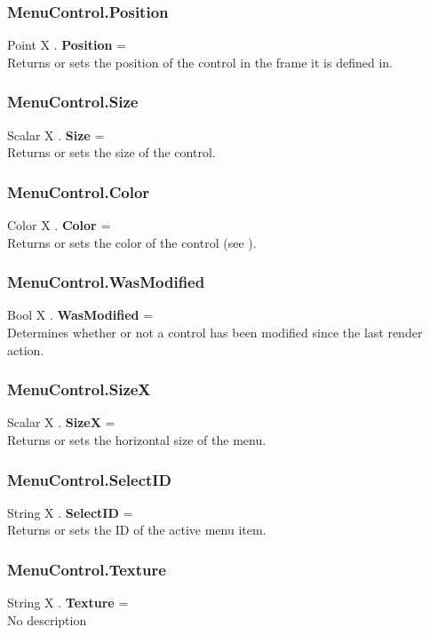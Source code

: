 \subsubsection{MenuControl.Position \label{F:MenuControl:Position}}
Point X . \textbf{Position} = \\
Returns or sets the position of the control in the frame it is defined in.

\subsubsection{MenuControl.Size \label{F:MenuControl:Size}}
Scalar X . \textbf{Size} = \\
Returns or sets the size of the control.

\subsubsection{MenuControl.Color \label{F:MenuControl:Color}}
Color X . \textbf{Color} = \\
Returns or sets the color of the control (see ).

\subsubsection{MenuControl.WasModified \label{F:MenuControl:WasModified}}
Bool X . \textbf{WasModified} = \\
Determines whether or not a control has been modified since the last render action.

\subsubsection{MenuControl.SizeX \label{F:MenuControl:SizeX}}
Scalar X . \textbf{SizeX} = \\
Returns or sets the horizontal size of the menu.

\subsubsection{MenuControl.SelectID \label{F:MenuControl:SelectID}}
String X . \textbf{SelectID} = \\
Returns or sets the ID of the active menu item.

\subsubsection{MenuControl.Texture \label{F:MenuControl:Texture}}
String X . \textbf{Texture} = \\
No description

